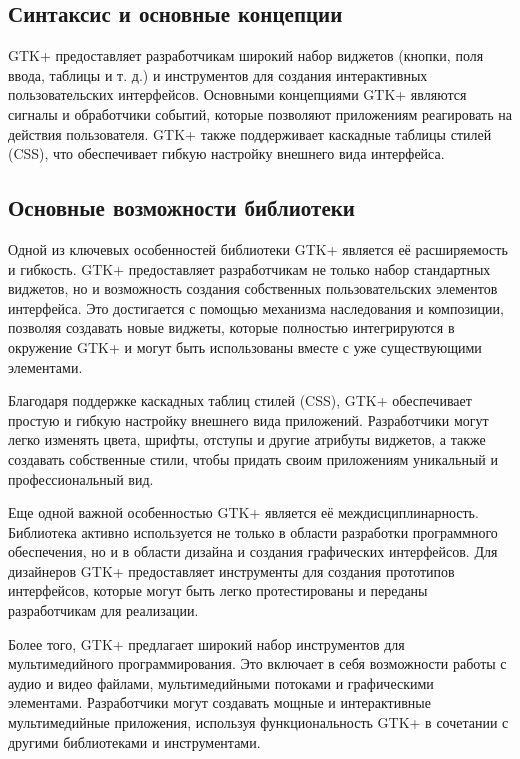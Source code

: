 \subsection{\label{subsec:ch01/sec02/sub02}Синтаксис и основные концепции}

GTK+ предоставляет разработчикам широкий набор виджетов (кнопки, поля ввода, таблицы и т. д.) и инструментов для создания интерактивных пользовательских интерфейсов. Основными концепциями GTK+ являются сигналы и обработчики событий, которые позволяют приложениям реагировать на действия пользователя. GTK+ также поддерживает каскадные таблицы стилей (CSS), что обеспечивает гибкую настройку внешнего вида интерфейса.


\subsection{\label{subsec:ch01/sec02/sub03}Основные возможности библиотеки}
Одной из ключевых особенностей библиотеки GTK+ является её расширяемость и гибкость. GTK+ предоставляет разработчикам не только набор стандартных виджетов, но и возможность создания собственных пользовательских элементов интерфейса. Это достигается с помощью механизма наследования и композиции, позволяя создавать новые виджеты, которые полностью интегрируются в окружение GTK+ и могут быть использованы вместе с уже существующими элементами.

Благодаря поддержке каскадных таблиц стилей (CSS), GTK+ обеспечивает простую и гибкую настройку внешнего вида приложений. Разработчики могут легко изменять цвета, шрифты, отступы и другие атрибуты виджетов, а также создавать собственные стили, чтобы придать своим приложениям уникальный и профессиональный вид.

Еще одной важной особенностью GTK+ является её междисциплинарность. Библиотека активно используется не только в области разработки программного обеспечения, но и в области дизайна и создания графических интерфейсов. Для дизайнеров GTK+ предоставляет инструменты для создания прототипов интерфейсов, которые могут быть легко протестированы и переданы разработчикам для реализации.

Более того, GTK+ предлагает широкий набор инструментов для мультимедийного программирования. Это включает в себя возможности работы с аудио и видео файлами, мультимедийными потоками и графическими элементами. Разработчики могут создавать мощные и интерактивные мультимедийные приложения, используя функциональность GTK+ в сочетании с другими библиотеками и инструментами.

